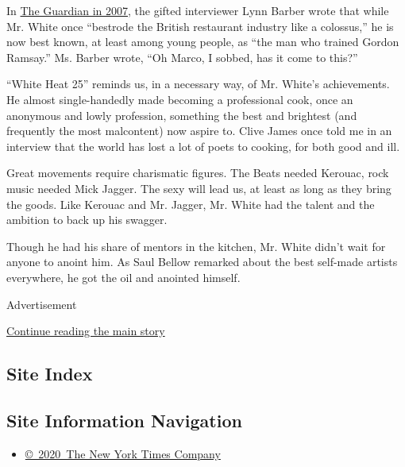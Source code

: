 In
\href{http://www.theguardian.com/lifeandstyle/2007/oct/21/foodanddrink.features9}{The
Guardian in 2007}, the gifted interviewer Lynn Barber wrote that while
Mr. White once ``bestrode the British restaurant industry like a
colossus,'' he is now best known, at least among young people, as ``the
man who trained Gordon Ramsay.'' Ms. Barber wrote, ``Oh Marco, I sobbed,
has it come to this?''

``White Heat 25'' reminds us, in a necessary way, of Mr. White's
achievements. He almost single-handedly made becoming a professional
cook, once an anonymous and lowly profession, something the best and
brightest (and frequently the most malcontent) now aspire to. Clive
James once told me in an interview that the world has lost a lot of
poets to cooking, for both good and ill.

Great movements require charismatic figures. The Beats needed Kerouac,
rock music needed Mick Jagger. The sexy will lead us, at least as long
as they bring the goods. Like Kerouac and Mr. Jagger, Mr. White had the
talent and the ambition to back up his swagger.

Though he had his share of mentors in the kitchen, Mr. White didn't wait
for anyone to anoint him. As Saul Bellow remarked about the best
self-made artists everywhere, he got the oil and anointed himself.

Advertisement

\protect\hyperlink{after-bottom}{Continue reading the main story}

\hypertarget{site-index}{%
\subsection{Site Index}\label{site-index}}

\hypertarget{site-information-navigation}{%
\subsection{Site Information
Navigation}\label{site-information-navigation}}

\begin{itemize}
\tightlist
\item
  \href{https://help.nytimes3xbfgragh.onion/hc/en-us/articles/115014792127-Copyright-notice}{©~2020~The
  New York Times Company}
\end{itemize}

